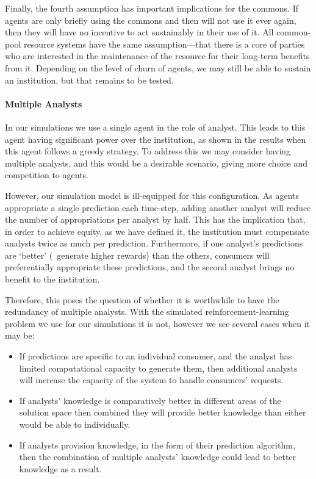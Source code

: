 Finally, the fourth assumption has important implications for the commons. If
agents are only briefly using the commons and then will not use it ever again,
then they will have no incentive to act sustainably in their use of it. All
common-pool resource systems have the same assumption---that there is a core
of parties who are interested in the maintenance of the resource for their
long-term benefits from it. Depending on the level of churn of agents, we may
still be able to sustain an institution, but that remains to be tested.

\paragraph{Multiple Analysts}  In our simulations we use a single agent in the
role of analyst. This leads to this agent having significant power over the
institution, as shown in the results when this agent follows a greedy
strategy. To address this we may consider having multiple analysts, and this
would be a desirable scenario, giving more choice and competition to agents.

However, our simulation model is ill-equipped for this configuration. As
agents appropriate a single prediction each time-step, adding another
analyst will reduce the number of appropriations per analyst by half. This has
the implication that, in order to achieve equity, as we have defined it, the
institution must compensate analysts twice as much per prediction.
Furthermore, if one analyst's predictions are `better' (\ie\ generate higher rewards) than the others, consumers will preferentially appropriate these
predictions, and the second analyst brings no benefit to the institution.

Therefore, this poses the question of whether it is worthwhile to have the
redundancy of multiple analysts. With the simulated reinforcement-learning
problem we use for our simulations it is not, however we see several cases when
it may be:

\begin{itemize}
\item If predictions are specific to an individual consumer, and the analyst has limited computational capacity to generate them, then additional analysts will increase the capacity of the system to handle consumers' requests.
\item If analysts' knowledge is comparatively better in different areas of the solution space then combined they will provide better knowledge than either would be able to individually.
\item If analysts provision knowledge, in the form of their prediction algorithm, then the combination of multiple analysts' knowledge could lead to better knowledge as a result. 
\end{itemize}



